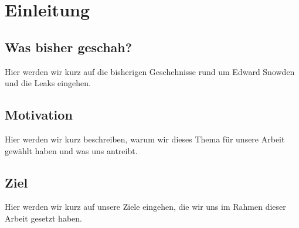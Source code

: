 \newpage
\section{Einleitung}

\subsection{Was bisher geschah?}
Hier werden wir kurz auf die bisherigen Geschehnisse rund um Edward Snowden und die Leaks eingehen.

\subsection{Motivation}
Hier werden wir kurz beschreiben, warum wir dieses Thema für unsere Arbeit gewählt haben und was uns antreibt.

\subsection{Ziel}
Hier werden wir kurz auf unsere Ziele eingehen, die wir uns im Rahmen dieser Arbeit gesetzt haben.
